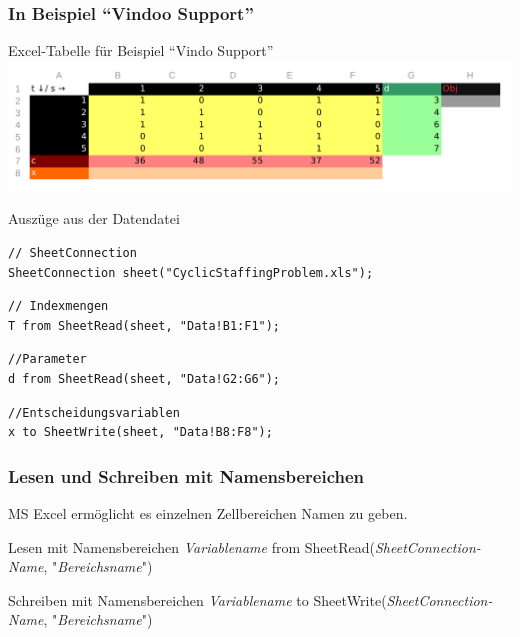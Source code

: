 \begin{frame}[fragile]
 \frametitle{In Beispiel "`Vindoo Support"'}
 \begin{block}{Excel-Tabelle für Beispiel "`Vindo Support"'}
  \centering
  \includegraphics[width=.9\linewidth]{Bilder/CyclicStaffingData}
 \end{block}
 \begin{block}{Auszüge aus der Datendatei}
\begin{lstlisting}[language=opldata,numbers=none,basicstyle=\ttfamily\scriptsize]
// SheetConnection
SheetConnection sheet("CyclicStaffingProblem.xls");
\end{lstlisting}\vspace{-2\baselineskip}
\begin{lstlisting}[language=opldata,numbers=none,basicstyle=\ttfamily\scriptsize]
// Indexmengen
T from SheetRead(sheet, "Data!B1:F1");
\end{lstlisting}\vspace{-2\baselineskip}
\begin{lstlisting}[language=opldata,numbers=none,basicstyle=\ttfamily\scriptsize]
//Parameter
d from SheetRead(sheet, "Data!G2:G6");
\end{lstlisting}\vspace{-2\baselineskip}
\begin{lstlisting}[language=opldata,numbers=none,basicstyle=\ttfamily\scriptsize]
//Entscheidungsvariablen
x to SheetWrite(sheet, "Data!B8:F8");
\end{lstlisting}
 \end{block}
\end{frame}

\begin{frame}
 \frametitle{Lesen und Schreiben mit Namensbereichen}
 MS Excel ermöglicht es einzelnen Zellbereichen Namen zu geben.
 \begin{block}{Lesen mit Namensbereichen}
  \ttfamily
  \textsf{\slshape Variablename} from SheetRead(\textsf{\slshape SheetConnection-Name}, "\textsf{\slshape Bereichsname}")
 \end{block}
 \begin{block}{Schreiben mit Namensbereichen}
  \ttfamily
  \textsf{\slshape Variablename} to SheetWrite(\textsf{\slshape SheetConnection-Name}, "\textsf{\slshape Bereichsname}")
 \end{block}
\end{frame}

